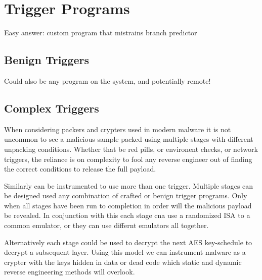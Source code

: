 

\section{Trigger Programs}
Easy answer: custom program that mistrains branch predictor

\subsection{Benign Triggers}
Could also be any program on the system, and potentially remote!


\subsection{Complex Triggers}
When considering packers and crypters used in modern malware it is not uncommon to see 
a malicious sample packed using multiple stages with different unpacking conditions. 
Whether that be red pills, or environent checks, or network triggers, the reliance is on
complexity to fool any reverse engineer out of finding the correct conditions to 
release the full payload.

Similarly \speculake can be instrumented to use more than one trigger. Multiple stages 
can be designed used any combination of crafted or benign trigger programs. Only when all
stages have been run to completion in order will the malicious payload be revealed.  
In conjunction with this each stage cna use a randomized ISA to a common emulator, or 
they can use differnt emulators all together. 

Alternatively each stage could be used to decrypt the next AES key-schedule to decrypt 
a subsequent layer. Using this model we can instrument \speculake malware as a crypter 
with the keys hidden in data or dead code which static and dynamic reverse engineering 
methods will overlook. 


